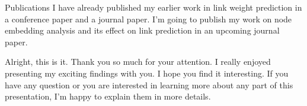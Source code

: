 \documentclass{beamer}
\begin{document}
\begin{frame}{Publications}
I have already published my earlier work in link weight prediction in a conference paper and a journal paper. I'm going to publish my work on node embedding analysis and its effect on link prediction in an upcoming journal paper.
\end{frame}

\begin{frame}
Alright, this is it. Thank you so much for your attention. I really enjoyed presenting my exciting findings with you. I hope you find it interesting. If you have any question or you are interested in learning more about any part of this presentation, I'm happy to explain them in more details.
\end{frame}
\end{document}
